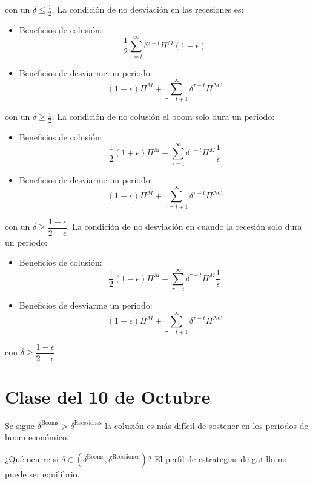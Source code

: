 \documentclass[letterpaper,12pt,twocolumn]{report}
\begin{document}
con un $\delta \leq \frac{1}{2}$. La condición de no desviación en las recesiones es:

\begin{itemize}
	\item Beneficios de colusión: $$ \dfrac{1}{2} \sum_{\tau=t}^{\infty}\delta ^{\tau-t}\Pi^M(1-\epsilon) $$
	
	\item Beneficios de desviarme un periodo: $$ (1-\epsilon)\Pi^{M}+\sum_{\tau=t+1}^{ \infty} \delta^{\tau-t}\Pi^{NC} $$
\end{itemize}

con un $\delta \geq \frac{1}{2}$. La condición de no colusión el boom solo dura un periodo:

\begin{itemize}
	\item Beneficios de colusión: $$ \dfrac{1}{2}(1+\epsilon)\Pi^M+ \sum_{\tau=t}^{\infty}\delta ^{\tau-t}\Pi^M\dfrac{1}{\epsilon} $$
	
	\item Beneficios de desviarme un periodo: $$ (1+\epsilon)\Pi^{M}+\sum_{\tau=t+1}^{ \infty} \delta^{\tau-t}\Pi^{NC} $$
\end{itemize}

con un $\delta \geq \dfrac{1+\epsilon}{2+\epsilon}$. La condición de no desviación en cuando la recesión solo dura un periodo:


\begin{itemize}
	\item Beneficios de colusión: $$ \dfrac{1}{2}(1-\epsilon)\Pi^M+ \sum_{\tau=t}^{\infty}\delta ^{\tau-t}\Pi^M\dfrac{1}{\epsilon} $$
	
	\item Beneficios de desviarme un periodo: $$ (1-\epsilon)\Pi^{M}+\sum_{\tau=t+1}^{ \infty} \delta^{\tau-t}\Pi^{NC} $$
\end{itemize}


con $\delta\geq \dfrac{1-\epsilon}{2-\epsilon}$.

\section{Clase del 10 de Octubre}

Se sigue $\delta^{\text{Booms}}>\delta^{\text{Recesiones}}$ la colusión es más difícil de sostener en los periodos de boom económico.

¿Qué ocurre si $\delta \in (\delta^{\text{Booms}},\delta^{\text{Recesiones}})$? El perfil de estrategias de gatillo no puede ser equilibrio.
\end{document}
